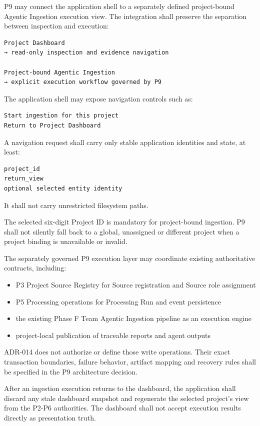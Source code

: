 P9 may connect the application shell to a separately defined project-bound Agentic Ingestion execution view. The integration shall preserve the separation between inspection and execution:

\begin{verbatim}
Project Dashboard
→ read-only inspection and evidence navigation

Project-bound Agentic Ingestion
→ explicit execution workflow governed by P9
\end{verbatim}

The application shell may expose navigation controls such as:

\begin{verbatim}
Start ingestion for this project
Return to Project Dashboard
\end{verbatim}

A navigation request shall carry only stable application identities and state, at least:

\begin{verbatim}
project_id
return_view
optional selected entity identity
\end{verbatim}

It shall not carry unrestricted filesystem paths.

The selected six-digit Project ID is mandatory for project-bound ingestion. P9 shall not silently fall back to a global, unassigned or different project when a project binding is unavailable or invalid.

The separately governed P9 execution layer may coordinate existing authoritative contracts, including:

\begin{itemize}
\tightlist
\item
  P3 Project Source Registry for Source registration and Source role assignment
\item
  P5 Processing operations for Processing Run and event persistence
\item
  the existing Phase F Team Agentic Ingestion pipeline as an execution engine
\item
  project-local publication of traceable reports and agent outputs
\end{itemize}

ADR-014 does not authorize or define those write operations. Their exact transaction boundaries, failure behavior, artifact mapping and recovery rules shall be specified in the P9 architecture decision.

After an ingestion execution returns to the dashboard, the application shall discard any stale dashboard snapshot and regenerate the selected project's view from the P2-P6 authorities. The dashboard shall not accept execution results directly as presentation truth.

